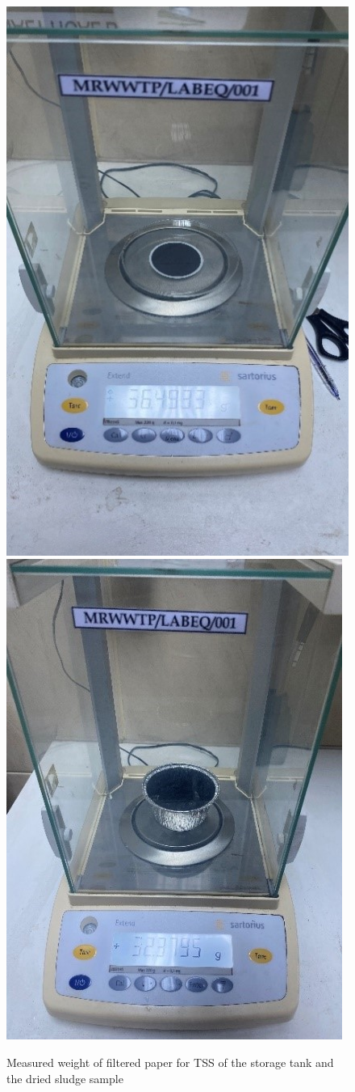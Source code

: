 \begin{figure}[H]
\centering

\includegraphics[width=.4\textwidth]{results/TSS.JPG}\hfill
\includegraphics[width=.45\textwidth]{results/Dewatered sludge.jpg}\hfill

\caption{Measured weight of filtered paper for \ac{TSS} of the storage tank and the dried sludge sample }
\label{fig: TSS and Moisture content}
\end{figure}
